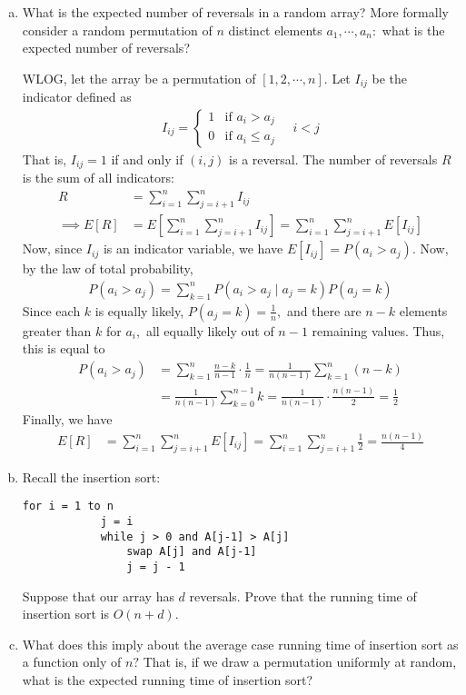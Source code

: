 \documentclass{article}
\begin{document}
\begin{enumerate}[(a)]
	\item What is the expected number of reversals in a random array? More formally consider a random permutation of $n$ distinct elements $a_1, \cdots, a_n:$ what is the expected number of reversals?
		\begin{soln}
			WLOG, let the array be a permutation of $[1, 2, \cdots, n].$ Let $I_{ij}$ be the indicator defined as
			\begin{align*}
				I_{ij} = \begin{cases}
					1 & \text{if } a_i>a_j \\
					0 & \text{if } a_i\le a_j
				\end{cases}\quad i<j
			\end{align*}
			That is, $I_{ij}=1$ if and only if $(i, j)$ is a reversal. The number of reversals $R$ is the sum of all indicators:
			\begin{align*}
				R &= \sum_{i=1}^{n} \sum_{j=i+1}^{n} I_{ij} \\
				\implies E[R] &= E\left[ \sum_{i=1}^{n} \sum_{j=i+1}^{n} I_{ij} \right] = \sum_{i=1}^{n} \sum_{j=i+1}^{n} E[I_{ij}]
			\end{align*}
			Now, since $I_{ij}$ is an indicator variable, we have $E[I_{ij}] = P(a_i>a_j).$ Now, by the law of total probability, 
			\begin{align*}
				P(a_i>a_j) = \sum_{k=1}^{n} P(a_i>a_j\mid a_j=k)P(a_j=k)
			\end{align*}
			Since each $k$ is equally likely, $P(a_j=k)=\frac{1}{n},$ and there are $n-k$ elements greater than $k$ for $a_i,$ all equally likely out of $n-1$ remaining values. Thus, this is equal to
			\begin{align*}
				P(a_i>a_j) &= \sum_{k=1}^{n} \frac{n-k}{n-1} \cdot \frac{1}{n} = \frac{1}{n(n-1)} \sum_{k=1}^{n} (n-k) \\
				&= \frac{1}{n(n-1)}\sum_{k=0}^{n-1} k = \frac{1}{n(n-1)} \cdot \frac{n(n-1)}{2} = \frac{1}{2}
			\end{align*}
			Finally, we have
			\begin{align*}
				E[R] &= \sum_{i=1}^{n} \sum_{j=i+1}^{n} E[I_{ij}] = \sum_{i=1}^{n} \sum_{j=i+1}^{n} \frac{1}{2} = \frac{n(n-1)}{4}
			\end{align*}
		\end{soln}

	\item Recall the insertion sort:		
		\begin{Verbatim}[tabsize=4]
		for i = 1 to n
			j = i
			while j > 0 and A[j-1] > A[j]
				swap A[j] and A[j-1]
				j = j - 1
		\end{Verbatim}
		Suppose that our array has $d$ reversals. Prove that the running time of insertion sort is $O(n+d).$

	\item What does this imply about the average case running time of insertion sort as a function only of $n?$ That is, if we draw a permutation uniformly at random, what is the expected running time of insertion sort? 
		
\end{enumerate}
\end{document}
